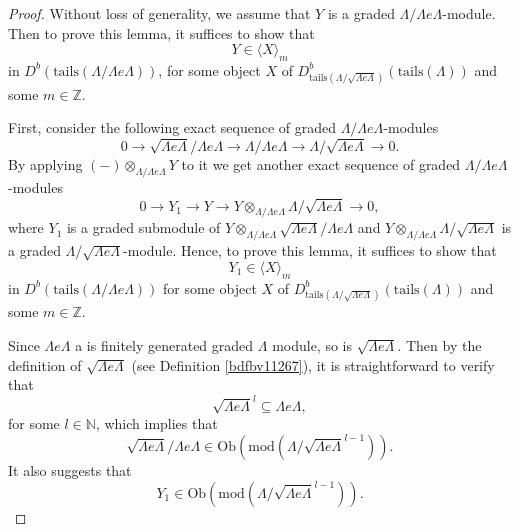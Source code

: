 \documentclass[11pt,reqno]{amsart}
\theoremstyle{definition}
\begin{document}
\begin{proof}
Without loss of generality, we 
assume that 
$Y$ is a graded $\Lambda/\Lambda e \Lambda$-module. 
Then to prove this lemma, it
suffices to show that 
$$
Y \in \langle X  \rangle_{m}
$$	
in $D^{b}(\mathrm{tails}(\Lambda / \Lambda e \Lambda))$, for some object $X$ of 
$D^{b}_{\mathrm{tails}(\Lambda/ \sqrt{ \Lambda e \Lambda})}(\mathrm{tails}(\Lambda))$ 
and some $m \in \mathbb{Z}$.   	

First, consider the following
exact sequence of
graded $\Lambda/ \Lambda e \Lambda$-modules 
$$
0 \longrightarrow   \sqrt{ \Lambda e \Lambda} / \Lambda e \Lambda 
\longrightarrow \Lambda/ \Lambda e \Lambda \longrightarrow \Lambda/ \sqrt{ \Lambda e \Lambda} \longrightarrow 0. 
$$
By applying 
$(-)\otimes
_{\Lambda/ \Lambda e \Lambda}
Y$ to it we get another 
exact sequence of graded 
$\Lambda/ \Lambda e \Lambda$-modules
$$
0 \longrightarrow Y_1 \longrightarrow Y \longrightarrow Y 
\otimes_{\Lambda/ \Lambda e \Lambda} \Lambda/ \sqrt{ \Lambda e \Lambda}  \longrightarrow 0,
$$
where
$Y_1$ is a graded submodule of $Y \otimes_{\Lambda/ \Lambda e \Lambda}
\sqrt{ \Lambda e \Lambda} / \Lambda e \Lambda$
and 
$ Y \otimes_{\Lambda/ \Lambda e \Lambda} \Lambda/ \sqrt{ \Lambda e \Lambda}$ is a graded
$\Lambda/ \sqrt{ \Lambda e \Lambda}$-module.  
Hence, to prove this lemma, it 
suffices to show that 
$$
Y_1
\in \langle X  \rangle_{m}
$$	
in $D^{b}(\mathrm{tails}(\Lambda / \Lambda e \Lambda))$ for some object $X$ of 
$D^{b}_{\mathrm{tails}(\Lambda/ \sqrt{ \Lambda e \Lambda})}(\mathrm{tails}(\Lambda))$ 
and some $m \in \mathbb{Z}$.   	

Since $\Lambda e \Lambda$ a is finitely generated graded $\Lambda$ module, 
so is $\sqrt{\Lambda e \Lambda}$.  
Then
by the definition of 
$\sqrt{\Lambda e \Lambda}$ 
(see Definition \ref{bdfbv11267}),
it is straightforward to verify that 
$$\sqrt{\Lambda e \Lambda}^l \subseteq \Lambda e \Lambda,$$ 
for some $l \in \mathbb{N}$,
which implies that 
$$
\sqrt{ \Lambda e \Lambda} / \Lambda e \Lambda \in 
\mathrm{Ob}(\mathrm{mod}( \Lambda / \sqrt{ \Lambda e \Lambda}^{l-1} ) ). 
$$
It also suggests that 
$$
Y_1 \in 
\mathrm{Ob}(\mathrm{mod}( \Lambda / \sqrt{ \Lambda e \Lambda}^{l-1} )). 
$$


\end{proof}
\end{document}
